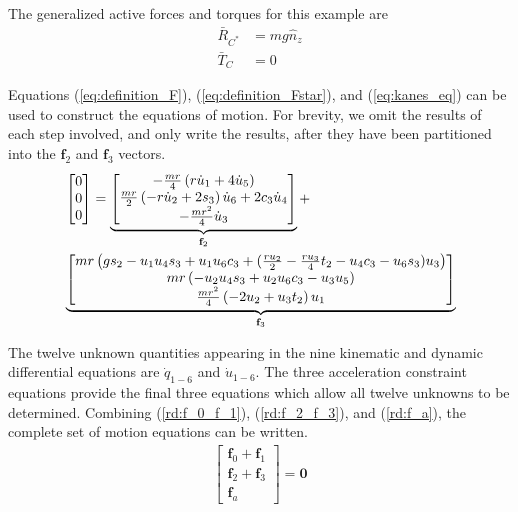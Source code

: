 \documentclass[smallcondensed,final]{svjour3}                     %
\begin{document}
The generalized active forces and torques for this example are
\begin{align}
    \bar{R}_{C^*} &= m g \hat{n}_z \\
    \bar{T}_C &= 0
\end{align}

Equations (\ref{eq:definition_F}), (\ref{eq:definition_Fstar}), and
(\ref{eq:kanes_eq}) can be used to construct the equations of motion.
For brevity, we omit the results of each step involved, and only write the
results, after they have been partitioned into the $\mathbf{f}_2$ and
$\mathbf{f}_3$ vectors.
\begin{align}
    \label{rd:f_2_f_3}
    & \left[\begin{matrix} 0\\ 0\\ 0\end{matrix}\right] =
    \underbrace{\left[\begin{matrix}- \frac{m r}{4} \left(r \dot{u}_{1} + 4
                \dot{u}_{5}\right)\\\frac{m r}{2} \left(- r \dot{u}_{2} + 2
                s_3\right) \dot{u}_{6} + 2 c_3
                \dot{u}_{4}\\- \frac{m r^{2}}{4}
                \dot{u}_{3}\end{matrix}\right]}_{\mathbf{f}_2} + \notag\\
    &\underbrace{\left[\begin{matrix}
                m r \left( g s_2 - u_1 u_4 s_3 + u_1 u_6 c_3
                    + (\frac{r u_2}{2} - \frac{r u_3}{4} t_2 - u_4
                c_3 - u_6 s_3) u_3 \right)
                \\m r \left(- u_{2} u_{4}
                s_3 + u_{2} u_{6}
                c_3 - u_{3} u_{5}\right)\\\frac{m r^{2}}{4}
                \left(- 2 u_{2} + u_{3} t_2\right)
                u_{1}\end{matrix}\right]}_{\mathbf{f}_3} 
\end{align}

The twelve unknown quantities appearing in the nine kinematic and dynamic
differential equations are $\dot{q}_{1-6}$ and $\dot{u}_{1-6}$. The three
acceleration constraint equations provide the final three equations which allow
all twelve unknowns to be determined. Combining (\ref{rd:f_0_f_1}),
(\ref{rd:f_2_f_3}), and (\ref{rd:f_a}), the complete set of motion equations
can be written.
\begin{align}
\label{rd:ode}
\begin{bmatrix} \mathbf{f}_0 + \mathbf{f}_1\\
                \mathbf{f}_2 + \mathbf{f}_3\\
                \mathbf{f}_a \end{bmatrix} = \mathbf{0}
\end{align}
\end{document}
